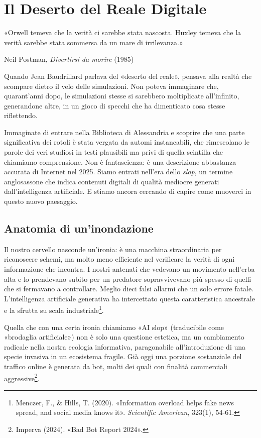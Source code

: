 \chapter{Il Deserto del Reale Digitale}
\label{cap:p4c39}

\epigraph{«Orwell temeva che la verità ci sarebbe stata nascosta. Huxley temeva che la verità sarebbe stata sommersa da un mare di irrilevanza.»}{Neil Postman, \textit{Divertirsi da morire} (1985)}

Quando Jean Baudrillard parlava del «deserto del reale», pensava alla realtà che scompare dietro il velo delle simulazioni. Non poteva immaginare che, quarant'anni dopo, le simulazioni stesse si sarebbero moltiplicate all'infinito, generandone altre, in un gioco di specchi che ha dimenticato cosa stesse riflettendo.

Immaginate di entrare nella Biblioteca di Alessandria e scoprire che una parte significativa dei rotoli è stata vergata da automi instancabili, che rimescolano le parole dei veri studiosi in testi plausibili ma privi di quella scintilla che chiamiamo comprensione. Non è fantascienza: è una descrizione abbastanza accurata di Internet nel 2025. Siamo entrati nell'era dello \textit{slop}, un termine anglosassone che indica contenuti digitali di qualità mediocre generati dall'intelligenza artificiale. E stiamo ancora cercando di capire come muoverci in questo nuovo paesaggio.

\section{Anatomia di un'inondazione}

Il nostro cervello nasconde un'ironia: è una macchina straordinaria per riconoscere schemi, ma molto meno efficiente nel verificare la verità di ogni informazione che incontra. I nostri antenati che vedevano un movimento nell'erba alta e lo prendevano subito per un predatore sopravvivevano più spesso di quelli che si fermavano a controllare. Meglio dieci falsi allarmi che un solo errore fatale. L'intelligenza artificiale generativa ha intercettato questa caratteristica ancestrale e la sfrutta su scala industriale\footnote{Menczer, F., \& Hills, T. (2020). «Information overload helps fake news spread, and social media knows it». \textit{Scientific American}, 323(1), 54-61.}.

Quella che con una certa ironia chiamiamo «AI slop» (traducibile come «brodaglia artificiale») non è solo una questione estetica, ma un cambiamento radicale nella nostra ecologia informativa, paragonabile all'introduzione di una specie invasiva in un ecosistema fragile. Già oggi una porzione sostanziale del traffico online è generata da bot, molti dei quali con finalità commerciali aggressive\footnote{Imperva (2024). «Bad Bot Report 2024».}.

